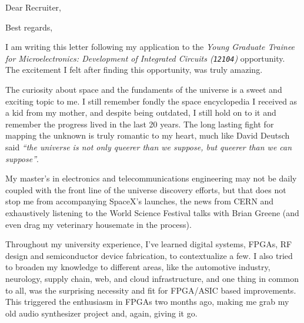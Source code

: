 \documentclass[11pt,a4paper,roman]{moderncv}
\begin{document}
\date{\today}
\opening{Dear Recruiter,}
\closing{Best regards,}
\makelettertitle



I am writing this letter following my application to the \emph{Young Graduate Trainee for Microelectronics: Development of Integrated Circuits (\texttt{12104})} opportunity.
The excitement I felt after finding this opportunity, was truly amazing. 


The curiosity about space and the fundaments of the universe is a sweet and exciting topic to me. I still remember fondly the space encyclopedia I received as a kid from my mother, and despite being outdated, I still hold on to it and remember the progress lived in the last 20 years.
The long lasting fight for mapping the unknown is truly romantic to my heart, much like David Deutsch said \textit{``the universe is not only queerer than we suppose, but queerer than we can suppose''}.

My master's in electronics and telecommunications engineering may not be daily coupled with the front line of the universe discovery efforts, but that does not stop me from accompanying SpaceX's launches, the news from CERN and  exhaustively listening to the World Science Festival talks with Brian Greene (and even drag my veterinary housemate in the process).

Throughout my university experience, I've learned digital systems, FPGAs, RF design and semiconductor device fabrication, to contextualize a few. I also tried to broaden my knowledge to different areas, like the automotive industry, neurology, supply chain, web, and cloud infrastructure, and one thing in common to all, was the surprising necessity and fit for FPGA/ASIC based improvements.
This triggered the enthusiasm in FPGAs two months ago, making me grab my old audio synthesizer project and, again, giving it go.
\end{document}
